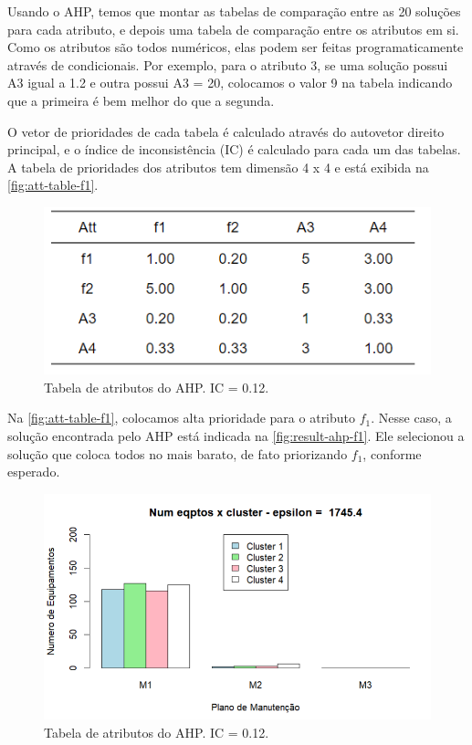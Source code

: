 \documentclass[conference]{IEEEtran}
\begin{document}
Usando o AHP, temos que montar as tabelas de comparação entre as 20 
soluções para cada atributo, e depois uma tabela de comparação entre os 
atributos em si. Como os atributos são todos numéricos, elas podem ser feitas 
programaticamente através de condicionais. Por exemplo, para o atributo 3, se uma solução 
possui A3 igual a 1.2 e outra possui A3 = 20, colocamos o valor 9 na tabela indicando 
que a primeira é bem melhor do que a segunda.

O vetor de prioridades de cada tabela é calculado através do autovetor direito 
principal, e o índice de inconsistência (IC) é calculado para cada um das tabelas.
A tabela de prioridades dos atributos tem dimensão 4 x 4 e está exibida na 
\autoref{fig:att-table-f1}.

\begin{figure}[htbp]
    \centering
    \includegraphics[width=\columnwidth,trim=1 1 1 1,clip]{../images/att-table-f1.png}
    \caption{\label{fig:att-table-f1}
	Tabela de atributos do AHP. IC = 0.12.}
\end{figure}

Na \autoref{fig:att-table-f1}, colocamos alta prioridade para o atributo $f_1$.
Nesse caso, a solução encontrada pelo AHP está indicada na \autoref{fig:result-ahp-f1}.
Ele selecionou a solução que coloca todos no mais barato, de fato priorizando $f_1$, conforme
esperado.

\begin{figure}[htbp]
    \centering
    \includegraphics[width=\columnwidth,trim=1 1 1 1,clip]{../images/result-ahp-f1.png}
    \caption{\label{fig:result-ahp-f1}
	Tabela de atributos do AHP. IC = 0.12.}
\end{figure}
\end{document}
